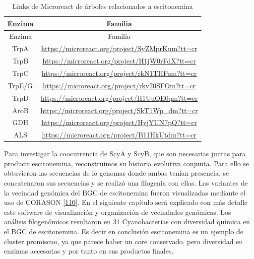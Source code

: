 \documentclass[12pt,twoside]{reedthesis}
\begin{document}
  \begin{longtable}[]{@{}cc@{}}
  \caption{Links de Microreact de árboles relacionados a escitonemina
  \label{tab:Microreact}}\tabularnewline
  \toprule
  Enzima & Familia\tabularnewline
  \midrule
  \endfirsthead
  \toprule
  Enzima & Familia\tabularnewline
  \midrule
  \endhead
  TrpA &
  \url{https://microreact.org/project/SyZMprKum?tt=cr}\tabularnewline
  TrpB &
  \url{https://microreact.org/project/H1jW0rFdX?tt=cr}\tabularnewline
  TrpC &
  \url{https://microreact.org/project/rkN1THFum?tt=cr}\tabularnewline
  TrpE/G &
  \url{https://microreact.org/project/rkv20SFOm?tt=cr}\tabularnewline
  TrpD &
  \url{https://microreact.org/project/H1UuQE0qm?tt=cr}\tabularnewline
  AroB &
  \url{https://microreact.org/project/SkT1Wp_dm?tt=cr}\tabularnewline
  GDH &
  \url{https://microreact.org/project/HyjYUN7pQ?tt=cr}\tabularnewline
  ALS &
  \url{https://microreact.org/project/B11HkUtdm?tt=cr}\tabularnewline
  \bottomrule
  \end{longtable}
  
  Para investigar la coocurrencia de ScyA y ScyB, que son necesarias
  juntas para producir escitonemina, reconstruimos su historia evolutiva
  conjunta. Para ello se obtuvieron las secuencias de lo genomas donde
  ambas tenían presencia, se concatenaron sus secuencias y se realizó una
  filogenia con ellas. Las variantes de la vecindad genómica del BGC de
  escitonemina fueron visualizadas mediante el uso de CORASON
  {[}\protect\hyperlink{ref-navarro-munoz_computational_2018}{110}{]}. En
  el siguiente capítulo será explicado con más detalle este software de
  visualización y organización de vecindades genómicas. Los análisis
  filogenómicos resultaron en 34 Cyanobacterias con diversidad química en
  el BGC de escitonemina. Es decir en conclusión escitonemina es un
  ejemplo de cluster promiscuo, ya que parece haber un core conservado,
  pero diversidad en enzimas accesorias y por tanto en sus productos
  finales.
  
\end{document}
